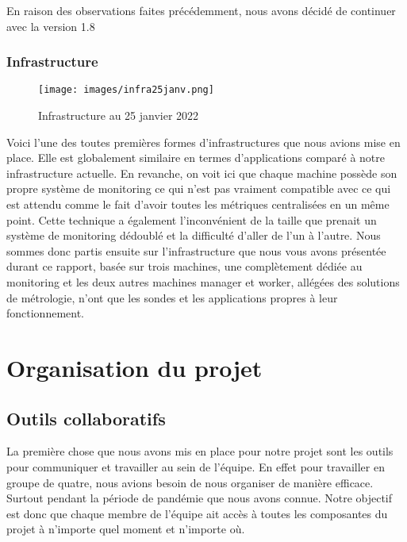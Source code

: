 \documentclass[oneside,12pt]{report}
\begin{document}
En raison des observations faites précédemment, nous avons décidé de continuer avec la version 1.8 \newline


\subsection{Infrastructure}

\begin{figure}[H]
    \centering
    \texttt{[image: images/infra25janv.png]}
    \caption{Infrastructure au 25 janvier 2022}
    \label{fig:mesh1}
\end{figure}

Voici l'une des toutes premières formes d'infrastructures que nous avions mise en place. Elle est globalement similaire en termes d'applications comparé à notre infrastructure actuelle. En revanche, on voit ici que chaque machine possède son propre système de monitoring ce qui n'est pas vraiment compatible avec ce qui est attendu comme le fait d'avoir toutes les métriques centralisées en un même point. Cette technique a également l'inconvénient de la taille que prenait un système de monitoring dédoublé et la difficulté d'aller de l'un à l'autre. Nous sommes donc partis ensuite sur l'infrastructure que nous vous avons présentée durant ce rapport, basée sur trois machines, une complètement dédiée au monitoring et les deux autres machines manager et worker, allégées des solutions de métrologie, n'ont que les sondes et les applications propres à leur fonctionnement.  

\chapter{Organisation du projet}

\section{Outils collaboratifs}

La première chose que nous avons mis en place pour notre projet sont les outils pour communiquer et travailler au sein de l'équipe. En effet pour travailler en groupe de quatre, nous avions besoin de nous organiser de manière efficace. Surtout pendant la période de pandémie que nous avons connue. Notre objectif est donc que chaque membre de l'équipe ait accès à toutes les composantes du projet à n'importe quel moment et n'importe où. \newline
\end{document}
